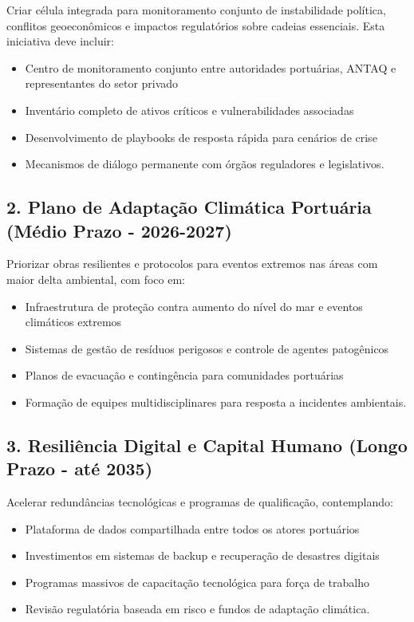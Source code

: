 \documentclass[
  portuguese,
  letterpaper,
  DIV=11,
  numbers=noendperiod]{scrreprt}
\providecommand{\tightlist}{%
  \setlength{\itemsep}{0pt}\setlength{\parskip}{0pt}}
\begin{document}
Criar célula integrada para monitoramento conjunto de instabilidade
política, conflitos geoeconômicos e impactos regulatórios sobre cadeias
essenciais. Esta iniciativa deve incluir:

\begin{itemize}
\tightlist
\item
  Centro de monitoramento conjunto entre autoridades portuárias, ANTAQ e
  representantes do setor privado
\item
  Inventário completo de ativos críticos e vulnerabilidades associadas
\item
  Desenvolvimento de playbooks de resposta rápida para cenários de crise
\item
  Mecanismos de diálogo permanente com órgãos reguladores e
  legislativos.
\end{itemize}

\subsection{2. Plano de Adaptação Climática Portuária (Médio Prazo -
2026-2027)}\label{plano-de-adaptauxe7uxe3o-climuxe1tica-portuuxe1ria-muxe9dio-prazo---2026-2027}

Priorizar obras resilientes e protocolos para eventos extremos nas áreas
com maior delta ambiental, com foco em:

\begin{itemize}
\tightlist
\item
  Infraestrutura de proteção contra aumento do nível do mar e eventos
  climáticos extremos
\item
  Sistemas de gestão de resíduos perigosos e controle de agentes
  patogênicos
\item
  Planos de evacuação e contingência para comunidades portuárias
\item
  Formação de equipes multidisciplinares para resposta a incidentes
  ambientais.
\end{itemize}

\subsection{3. Resiliência Digital e Capital Humano (Longo Prazo - até
2035)}\label{resiliuxeancia-digital-e-capital-humano-longo-prazo---atuxe9-2035}

Acelerar redundâncias tecnológicas e programas de qualificação,
contemplando:

\begin{itemize}
\tightlist
\item
  Plataforma de dados compartilhada entre todos os atores portuários
\item
  Investimentos em sistemas de backup e recuperação de desastres
  digitais
\item
  Programas massivos de capacitação tecnológica para força de trabalho
\item
  Revisão regulatória baseada em risco e fundos de adaptação climática.
\end{itemize}
\end{document}
